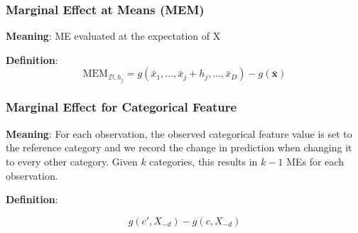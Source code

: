 \documentclass{article}
\theoremstyle{definition}
\begin{document}

        \subsubsection{Marginal Effect at Means (MEM)}
        \textbf{Meaning}: ME evaluated at the expectation of X

        \bigskip

        \textbf{Definition}:
        \begin{equation*}
            \text{MEM}_{\mathcal{D},h_j} = g(\bar{x}_1,\ldots,\bar{x}_j + h_j,\ldots,\bar{x}_D) - g(\bar{\mathbf{x}})
        \end{equation*}

    

        \subsubsection{Marginal Effect for Categorical Feature}
        \textbf{Meaning}:         For each observation, the observed categorical feature value is set to the reference category and we record the change in prediction when changing it to every other category. Given $k$ categories, this results in $k-1$ MEs for each observation. 

        \bigskip

        \textbf{Definition}: 

    



        \begin{equation*}
            g(c',X_{-d}) - g(c,X_{-d})
        \end{equation*}
\end{document}
